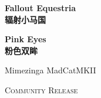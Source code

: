 \begin{titlepage}
    
\begin{center}


{\huge \bfseries
Fallout Equestria \medskip \\ 辐射小马国
}

\bigskip

{\LARGE \bfseries
Pink Eyes \medskip \\ 粉色双眸
}

\vspace{6em}

Mimezinga \quad MadCatMKII

\vfill

{\scshape Community Release}


\end{center}

\end{titlepage}

